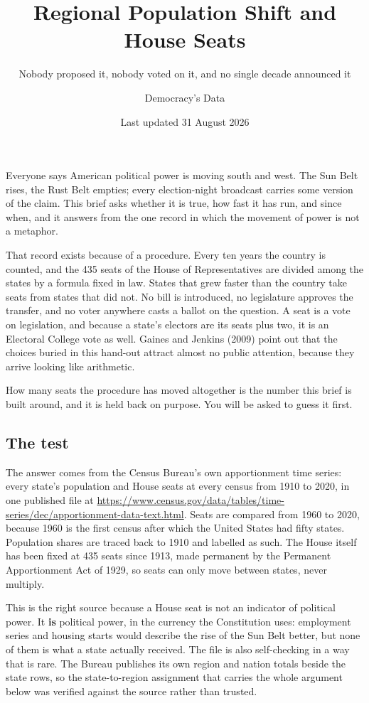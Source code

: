 \documentclass[
]{article}
\title{Regional Population Shift and House Seats}
\subtitle{Nobody proposed it, nobody voted on it, and no single decade
announced it}
\author{Democracy's Data}
\date{Last updated 31 August 2026}
\newcounter{none} %
\begin{document}
\maketitle

Everyone says American political power is moving south and west. The Sun
Belt rises, the Rust Belt empties; every election-night broadcast
carries some version of the claim. This brief asks whether it is true,
how fast it has run, and since when, and it answers from the one record
in which the movement of power is not a metaphor.

That record exists because of a procedure. Every ten years the country
is counted, and the 435 seats of the House of Representatives are
divided among the states by a formula fixed in law. States that grew
faster than the country take seats from states that did not. No bill is
introduced, no legislature approves the transfer, and no voter anywhere
casts a ballot on the question. A seat is a vote on legislation, and
because a state's electors are its seats plus two, it is an Electoral
College vote as well. Gaines and Jenkins (2009) point out that the
choices buried in this hand-out attract almost no public attention,
because they arrive looking like arithmetic.

How many seats the procedure has moved altogether is the number this
brief is built around, and it is held back on purpose. You will be asked
to guess it first.

\subsection{The test}\label{the-test}

The answer comes from the Census Bureau's own apportionment time series:
every state's population and House seats at every census from 1910 to
2020, in one published file at
\url{https://www.census.gov/data/tables/time-series/dec/apportionment-data-text.html}.
Seats are compared from 1960 to 2020, because 1960 is the first census
after which the United States had fifty states. Population shares are
traced back to 1910 and labelled as such. The House itself has been
fixed at 435 seats since 1913, made permanent by the Permanent
Apportionment Act of 1929, so seats can only move between states, never
multiply.

This is the right source because a House seat is not an indicator of
political power. It \textbf{is} political power, in the currency the
Constitution uses: employment series and housing starts would describe
the rise of the Sun Belt better, but none of them is what a state
actually received. The file is also self-checking in a way that is rare.
The Bureau publishes its own region and nation totals beside the state
rows, so the state-to-region assignment that carries the whole argument
below was verified against the source rather than trusted.
\end{document}
